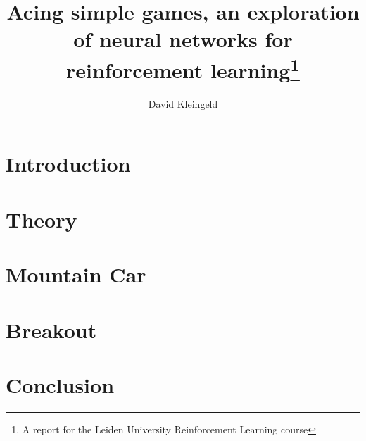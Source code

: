 \documentclass{tufte-handout}
\title{Acing simple games, an exploration of neural networks for reinforcement learning\thanks{A report for the Leiden University Reinforcement Learning course}}
\author{David Kleingeld}
\begin{document}
\maketitle%

\begin{abstract}
\noindent 
\end{abstract}

\tableofcontents

\section{Introduction}

\clearpage
\section{Theory}

\section{Mountain Car}


\clearpage
\section{Breakout}


\clearpage
\section{Conclusion}

\clearpage
\begin{appendices}
    
\end{appendices}

\newpage
\renewcommand{\bibname}{References}


\end{document}
